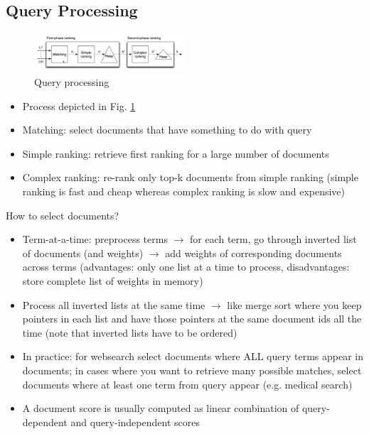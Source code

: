 \subsection{Query Processing}
\begin{figure}[h!]
	\centering
	\includegraphics[width=0.5\textwidth]{figures/query_processing.png}
	\caption{Query processing}
	\label{img:query_processing}
\end{figure}
\begin{itemize}
	\item Process depicted in Fig. \ref{img:query_processing}
	\item Matching: select documents that have something to do with query
	\item Simple ranking: retrieve first ranking for a large number of documents
	\item Complex ranking: re-rank only top-k documents from simple ranking (simple ranking is fast and cheap whereas complex ranking is slow and expensive)
\end{itemize}
How to select documents?
\begin{itemize}
	\item Term-at-a-time: preprocess terms $\rightarrow$ for each term, go through inverted list of documents (and weights) $\rightarrow$ add weights of corresponding documents across terms (advantages: only one list at a time to process, disadvantages: store complete list of weights in memory)
	\item Process all inverted lists at the same time $\rightarrow$ like merge sort where you keep pointers in each list and have those pointers at the same document ids all the time (note that inverted lists have to be ordered)
	\item In practice: for websearch select documents where ALL query terms appear in documents; in cases where you want to retrieve many possible matches, select documents where at least one term from query appear (e.g. medical search)
	\item A document score is usually computed as linear combination of query-dependent and query-independent scores
\end{itemize}
